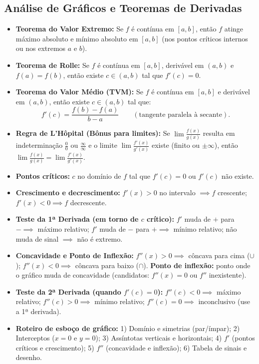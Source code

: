 \documentclass[10pt,a4paper]{article}
\begin{document}
\subsection{Análise de Gráficos e Teoremas de Derivadas}
\begin{teo}
    \begin{itemize}
        \item \textbf{Teorema do Valor Extremo:} Se $f$ é contínua em $[a,b]$, então $f$ atinge máximo absoluto e mínimo absoluto em $[a,b]$ (nos pontos críticos internos ou nos extremos $a$ e $b$).
        \item \textbf{Teorema de Rolle:} Se $f$ é contínua em $[a,b]$, derivável em $(a,b)$ e $f(a)=f(b)$, então existe $c \in (a,b)$ tal que $f'(c)=0$.
        \item \textbf{Teorema do Valor Médio (TVM):} Se $f$ é contínua em $[a,b]$ e derivável em $(a,b)$, então existe $c \in (a,b)$ tal que:
              \[
                  f'(c) = \frac{f(b) - f(a)}{b - a} \qquad (\text{tangente paralela à secante}).
              \]
        \item \textbf{Regra de L'Hôpital (Bônus para limites):} Se $\lim \frac{f(x)}{g(x)}$ resulta em indeterminação $\frac{0}{0}$ ou $\frac{\infty}{\infty}$ e o limite $\lim \frac{f'(x)}{g'(x)}$ existe (finito ou $\pm\infty$), então $\displaystyle \lim \frac{f(x)}{g(x)} = \lim \frac{f'(x)}{g'(x)}$.
    \end{itemize}
\end{teo}

\begin{itemize}
    \item \textbf{Pontos críticos:} $c$ no domínio de $f$ tal que $f'(c) = 0$ ou $f'(c)$ não existe.
    \item \textbf{Crescimento e decrescimento:} $f'(x) > 0$ no intervalo $\implies f$ crescente; \quad $f'(x) < 0 \implies f$ decrescente.
    \item \textbf{Teste da 1ª Derivada (em torno de $c$ crítico):}
          $f'$ muda de $+$ para $- \implies$ máximo relativo; \quad
          $f'$ muda de $-$ para $+ \implies$ mínimo relativo; \quad
          não muda de sinal $\implies$ não é extremo.
    \item \textbf{Concavidade e Ponto de Inflexão:}
          $f''(x) > 0 \implies$ côncava para cima ($\cup$); \quad $f''(x) < 0 \implies$ côncava para baixo ($\cap$).
          \textbf{Ponto de inflexão:} ponto onde o gráfico muda de concavidade (candidatos: $f''(x)=0$ ou $f''$ inexistente).
    \item \textbf{Teste da 2ª Derivada (quando $f'(c) = 0$):}
          $f''(c) < 0 \implies$ máximo relativo; \quad $f''(c) > 0 \implies$ mínimo relativo; \quad $f''(c)=0 \implies$ inconclusivo (use a 1ª derivada).
    \item \textbf{Roteiro de esboço de gráfico:}
          1) Domínio e simetrias (par/ímpar); 2) Interceptos ($x=0$ e $y=0$); 3) Assíntotas verticais e horizontais; 4) $f'$ (pontos críticos e crescimento); 5) $f''$ (concavidade e inflexão); 6) Tabela de sinais e desenho.
\end{itemize}
\end{document}
